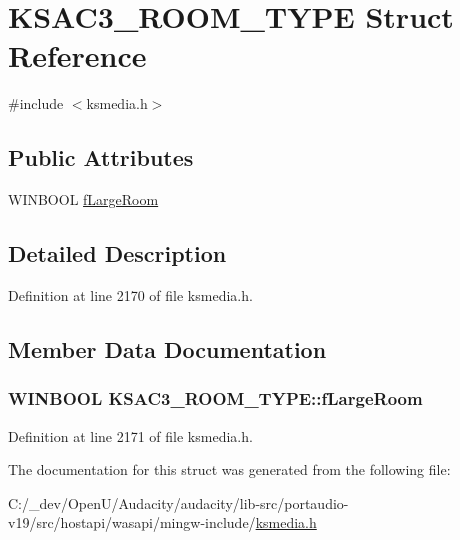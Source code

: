 \hypertarget{struct_k_s_a_c3___r_o_o_m___t_y_p_e}{}\section{K\+S\+A\+C3\+\_\+\+R\+O\+O\+M\+\_\+\+T\+Y\+PE Struct Reference}
\label{struct_k_s_a_c3___r_o_o_m___t_y_p_e}


{\ttfamily \#include $<$ksmedia.\+h$>$}

\subsection*{Public Attributes}
\begin{DoxyCompactItemize}
\item 
W\+I\+N\+B\+O\+OL \hyperlink{struct_k_s_a_c3___r_o_o_m___t_y_p_e_a7c65cd405b4ef7f5fe411936c7cb2968}{f\+Large\+Room}
\end{DoxyCompactItemize}


\subsection{Detailed Description}


Definition at line 2170 of file ksmedia.\+h.



\subsection{Member Data Documentation}
\subsubsection[{\texorpdfstring{f\+Large\+Room}{fLargeRoom}}]{\setlength{\rightskip}{0pt plus 5cm}W\+I\+N\+B\+O\+OL K\+S\+A\+C3\+\_\+\+R\+O\+O\+M\+\_\+\+T\+Y\+P\+E\+::f\+Large\+Room}\hypertarget{struct_k_s_a_c3___r_o_o_m___t_y_p_e_a7c65cd405b4ef7f5fe411936c7cb2968}{}\label{struct_k_s_a_c3___r_o_o_m___t_y_p_e_a7c65cd405b4ef7f5fe411936c7cb2968}


Definition at line 2171 of file ksmedia.\+h.



The documentation for this struct was generated from the following file\+:\begin{DoxyCompactItemize}
\item 
C\+:/\+\_\+dev/\+Open\+U/\+Audacity/audacity/lib-\/src/portaudio-\/v19/src/hostapi/wasapi/mingw-\/include/\hyperlink{ksmedia_8h}{ksmedia.\+h}\end{DoxyCompactItemize}
